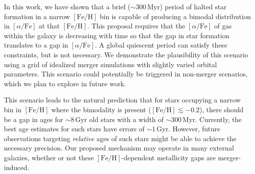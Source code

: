 \documentclass[twocolumn,linenumbers,trackchanges]{aastex631}
\newcommand{\Gyr}{\ensuremath{\textrm{Gyr}}}
\newcommand{\Myr}{\ensuremath{\textrm{Myr}}}
\newcommand{\FeH}{\ensuremath{[\textrm{Fe}/\textrm{H}]}}
\newcommand{\alphaFe}{\ensuremath{[\alpha/\textrm{Fe}]}}
\begin{document}
In this work, we have shown that a brief ($\sim300\,\Myr$) period of halted star formation in a narrow \FeH{} bin is capable of producing a bimodal distribution in \alphaFe{} at that \FeH{}. This proposal requires that the \alphaFe{} of gas within the galaxy is decreasing with time so that the gap in star formation translates to a gap in \alphaFe{}. A global quiescent period can satisfy these constraints, but is not necessary. We demonstrate the plausibility of this scenario using a grid of idealized merger simulations with slightly varied orbital parameters. This scenario could potentially be triggered in non-merger scenarios, which we plan to explore in future work.

This scenario leads to the natural prediction that for stars occupying a narrow bin in \FeH{} where the bimodality is present ($\FeH\lesssim-0.2$), there should be a gap in ages for $\sim8\,\Gyr$ old stars with a width of $\sim300\,\Myr$. Currently, the best age estimates for such stars have errors of $\sim1\,\Gyr$. However, future observations targeting \textit{relative} ages of such stars might be able to achieve the necessary precision. Our proposed mechanism may operate in many external galaxies, whether or not these \FeH{}-dependent metallicity gaps are merger-induced.
\end{document}
